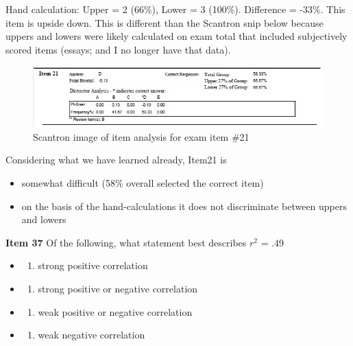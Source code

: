 \documentclass[
  english,
]{book}
\providecommand{\tightlist}{%
  \setlength{\itemsep}{0pt}\setlength{\parskip}{0pt}}
\begin{document}
Hand calculation: Upper = 2 (66\%), Lower = 3 (100\%). Difference = -33\%. This item is upside down. This is different than the Scantron snip below because uppers and lowers were likely calculated on exam total that included subjectively scored items (essays; and I no longer have that data).

\begin{figure}
\centering
\includegraphics{images/ItemAnalExam/Item21.jpg}
\caption{Scantron image of item analysis for exam item \#21}
\end{figure}

Considering what we have learned already, Item21 is

\begin{itemize}
\tightlist
\item
  somewhat difficult (58\% overall selected the correct item)
\item
  on the basis of the hand-calculations it does not discriminate between uppers and lowers
\end{itemize}

\textbf{Item 37} Of the following, what statement best describes \(r^2\) = .49

\begin{itemize}
\item
  \begin{enumerate}
  \def\labelenumi{\alph{enumi})}
  \tightlist
  \item
    strong positive correlation
  \end{enumerate}
\item
  \begin{enumerate}
  \def\labelenumi{\alph{enumi})}
  \setcounter{enumi}{1}
  \tightlist
  \item
    strong positive or negative correlation
  \end{enumerate}
\item
  \begin{enumerate}
  \def\labelenumi{\alph{enumi})}
  \setcounter{enumi}{2}
  \tightlist
  \item
    weak positive or negative correlation
  \end{enumerate}
\item
  \begin{enumerate}
  \def\labelenumi{\alph{enumi})}
  \setcounter{enumi}{3}
  \tightlist
  \item
    weak negative correlation
  \end{enumerate}
\end{itemize}
\end{document}
